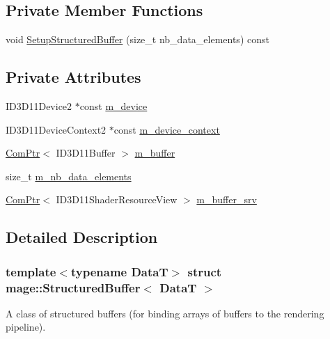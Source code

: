 \subsection*{Private Member Functions}
\begin{DoxyCompactItemize}
\item 
void \hyperlink{structmage_1_1_structured_buffer_a569008d501e11d208288022372df2f48}{Setup\+Structured\+Buffer} (size\+\_\+t nb\+\_\+data\+\_\+elements) const
\end{DoxyCompactItemize}
\subsection*{Private Attributes}
\begin{DoxyCompactItemize}
\item 
I\+D3\+D11\+Device2 $\ast$const \hyperlink{structmage_1_1_structured_buffer_ab1ad27b8053f9631f0a74b9e90aa7d3d}{m\+\_\+device}
\item 
I\+D3\+D11\+Device\+Context2 $\ast$const \hyperlink{structmage_1_1_structured_buffer_a1bdf6ee33d3d53bfd3d5f6191fdbc351}{m\+\_\+device\+\_\+context}
\item 
\hyperlink{namespacemage_ae74f374780900893caa5555d1031fd79}{Com\+Ptr}$<$ I\+D3\+D11\+Buffer $>$ \hyperlink{structmage_1_1_structured_buffer_adbd113ab2fe539e34587887876fe3825}{m\+\_\+buffer}
\item 
size\+\_\+t \hyperlink{structmage_1_1_structured_buffer_a92c53203287f6ef5ab8ed88c7b588e72}{m\+\_\+nb\+\_\+data\+\_\+elements}
\item 
\hyperlink{namespacemage_ae74f374780900893caa5555d1031fd79}{Com\+Ptr}$<$ I\+D3\+D11\+Shader\+Resource\+View $>$ \hyperlink{structmage_1_1_structured_buffer_a94f811f1d36cf63dad600e6f89dcc40b}{m\+\_\+buffer\+\_\+srv}
\end{DoxyCompactItemize}


\subsection{Detailed Description}
\subsubsection*{template$<$typename DataT$>$\newline
struct mage\+::\+Structured\+Buffer$<$ Data\+T $>$}

A class of structured buffers (for binding arrays of buffers to the rendering pipeline).



